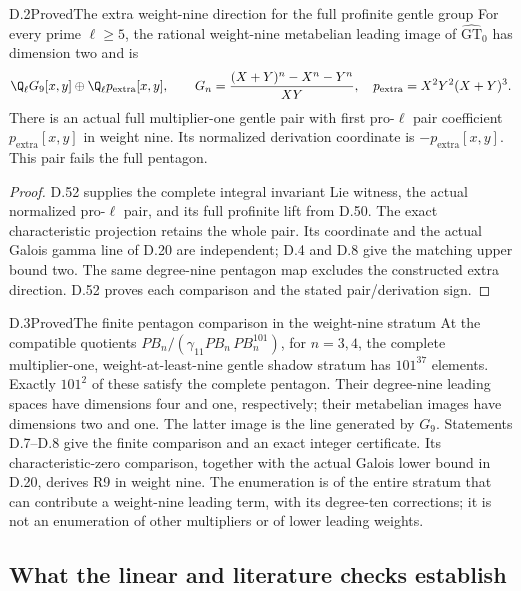 \begin{statement}{D.2}{Proved}{The extra weight-nine direction for the full profinite gentle group}
For every prime $\ell\geq5$, the rational weight-nine metabelian
leading image of $\widehat{\mathrm{GT}}_0$ has dimension two and is
\[
 \Q_\ell G_9[x,y]\oplus\Q_\ell p_{\mathrm{extra}}[x,y],
 \qquad
 G_n=\frac{(X+Y)^n-X^n-Y^n}{XY},\quad
 p_{\mathrm{extra}}=X^2Y^2(X+Y)^3.
\]
There is an actual full multiplier-one gentle pair with first
pro-$\ell$ pair coefficient $p_{\mathrm{extra}}[x,y]$ in weight nine.
Its normalized derivation coordinate is
$-p_{\mathrm{extra}}[x,y]$. This pair fails the full pentagon.
\end{statement}
\begin{proof}
D.52 supplies the complete integral invariant Lie witness, the actual
normalized pro-$\ell$ pair, and its full profinite lift from D.50.
The exact characteristic projection retains the whole pair. Its
coordinate and the actual Galois gamma line of D.20 are independent;
D.4 and D.8 give the matching upper bound two. The same degree-nine
pentagon map excludes the constructed extra direction. D.52 proves
each comparison and the stated pair/derivation sign.
\end{proof}

\begin{statement}{D.3}{Proved}{The finite pentagon comparison in the weight-nine stratum}
At the compatible quotients
$PB_n/(\gamma_{11}PB_n\,PB_n^{101})$, for $n=3,4$, the complete
multiplier-one, weight-at-least-nine gentle shadow stratum has
$101^{37}$ elements. Exactly $101^2$ of these satisfy the complete
pentagon. Their degree-nine leading spaces have dimensions four and
one, respectively; their metabelian images have dimensions two and
one. The latter image is the line generated by $G_9$.
Statements D.7--D.8 give the finite comparison and an exact integer
certificate. Its characteristic-zero comparison, together with the
actual Galois lower bound in D.20, derives R9 in weight nine.
The enumeration is of the entire stratum that can contribute a
weight-nine leading term, with its degree-ten corrections; it is
not an enumeration of other multipliers or of lower leading weights.
\end{statement}

\subsection{What the linear and literature checks establish}

